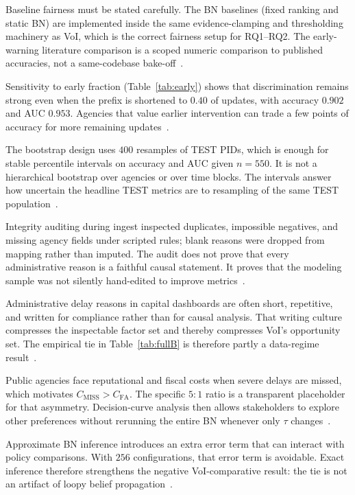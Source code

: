 Baseline fairness must be stated carefully. The BN baselines (fixed ranking and static BN) are implemented inside the same evidence-clamping and thresholding machinery as VoI, which is the correct fairness setup for RQ1--RQ2. The early-warning literature comparison is a scoped numeric comparison to published accuracies, not a same-codebase bake-off~\cite{Khodabakhshian2025,Tagharobi2025,Egwim2021}.

Sensitivity to early fraction (Table~\ref{tab:early}) shows that discrimination remains strong even when the prefix is shortened to $0.40$ of updates, with accuracy $0.902$ and AUC $0.953$. Agencies that value earlier intervention can trade a few points of accuracy for more remaining updates~\cite{Tagharobi2025}.

The bootstrap design uses $400$ resamples of TEST PIDs, which is enough for stable percentile intervals on accuracy and AUC given $n{=}550$. It is not a hierarchical bootstrap over agencies or over time blocks. The intervals answer how uncertain the headline TEST metrics are to resampling of the same TEST population~\cite{GneitingRaftery2007,Hand2009}.

Integrity auditing during ingest inspected duplicates, impossible negatives, and missing agency fields under scripted rules; blank reasons were dropped from mapping rather than imputed. The audit does not prove that every administrative reason is a faithful causal statement. It proves that the modeling sample was not silently hand-edited to improve metrics~\cite{Woldesenbet2016}.

Administrative delay reasons in capital dashboards are often short, repetitive, and written for compliance rather than for causal analysis. That writing culture compresses the inspectable factor set and thereby compresses VoI's opportunity set. The empirical tie in Table~\ref{tab:fullB} is therefore partly a data-regime result~\cite{Woldesenbet2016,Assaf2006}.

Public agencies face reputational and fiscal costs when severe delays are missed, which motivates $C_{\mathrm{MISS}}>C_{\mathrm{FA}}$. The specific $5{:}1$ ratio is a transparent placeholder for that asymmetry. Decision-curve analysis then allows stakeholders to explore other preferences without rerunning the entire BN whenever only $\tau$ changes~\cite{Vickers2006,Howard1966,Love2015}.

Approximate BN inference introduces an extra error term that can interact with policy comparisons. With $256$ configurations, that error term is avoidable. Exact inference therefore strengthens the negative VoI-comparative result: the tie is not an artifact of loopy belief propagation~\cite{Heckerman1996,Onisko2001}.

